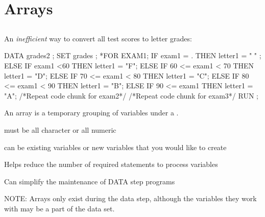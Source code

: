 \section[Arrays]{Arrays}
\subsection{}
\begin{frame}
\end{frame}

\begin{frame}[fragile]
\footnotesize
{}
\emp
\end{frame}

\begin{frame}[fragile]
An \emph{inefficient} way to convert all test scores to letter grades:
\footnotesize
\begin{code}{.0}
DATA grades2 ;
	SET grades ;
	*FOR EXAM1;
	IF exam1 = . THEN letter1 = " " ;
	ELSE IF exam1 <60 THEN letter1 = "F";
	ELSE IF 60 <= exam1 < 70 THEN letter1 = "D";
	ELSE IF 70 <= exam1 < 80 THEN letter1 = "C";
	ELSE IF 80 <= exam1 < 90 THEN letter1 = "B";
	ELSE IF 90 <= exam1 THEN letter1 = "A";
	/*Repeat code chunk for exam2*/
	/*Repeat code chunk for exam3*/
RUN ;
\end{code}
\emp
\end{frame}

\begin{frame}
\bi
\item {}  An array is a temporary grouping of variables under a .
\bi
\item must be all character or all numeric
\item can be existing variables or new variables that you would like to create
\ei
\item Helps reduce the number of required statements to process variables
\item Can simplify the maintenance of DATA step programs
\item NOTE: Arrays only exist during the data step, although the variables they work with may be a part of the data set.
\ei
\end{frame}

